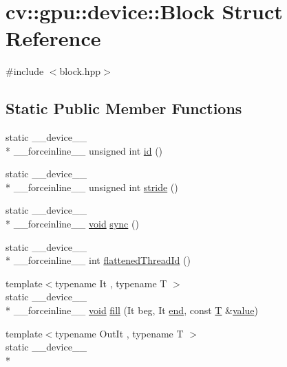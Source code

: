 \hypertarget{structcv_1_1gpu_1_1device_1_1Block}{\section{cv\-:\-:gpu\-:\-:device\-:\-:Block Struct Reference}
\label{structcv_1_1gpu_1_1device_1_1Block}
}


{\ttfamily \#include $<$block.\-hpp$>$}

\subsection*{Static Public Member Functions}
\begin{DoxyCompactItemize}
\item 
static \-\_\-\-\_\-device\-\_\-\-\_\- \\*
\-\_\-\-\_\-forceinline\-\_\-\-\_\- unsigned int \hyperlink{structcv_1_1gpu_1_1device_1_1Block_a281c6ab4eaef548f3cd42370a52c4a69}{id} ()
\item 
static \-\_\-\-\_\-device\-\_\-\-\_\- \\*
\-\_\-\-\_\-forceinline\-\_\-\-\_\- unsigned int \hyperlink{structcv_1_1gpu_1_1device_1_1Block_a998255c661a3814a93b805107d785fc2}{stride} ()
\item 
static \-\_\-\-\_\-device\-\_\-\-\_\- \\*
\-\_\-\-\_\-forceinline\-\_\-\-\_\- \hyperlink{legacy_8hpp_a8bb47f092d473522721002c86c13b94e}{void} \hyperlink{structcv_1_1gpu_1_1device_1_1Block_acdd49688468cd51c8ea0dddb7e52f55e}{sync} ()
\item 
static \-\_\-\-\_\-device\-\_\-\-\_\- \\*
\-\_\-\-\_\-forceinline\-\_\-\-\_\- int \hyperlink{structcv_1_1gpu_1_1device_1_1Block_ad005a95f3a705d55ae86f0c7fb8da308}{flattened\-Thread\-Id} ()
\item 
{\footnotesize template$<$typename It , typename T $>$ }\\static \-\_\-\-\_\-device\-\_\-\-\_\- \\*
\-\_\-\-\_\-forceinline\-\_\-\-\_\- \hyperlink{legacy_8hpp_a8bb47f092d473522721002c86c13b94e}{void} \hyperlink{structcv_1_1gpu_1_1device_1_1Block_a5c027dfe2cc3280ac3e54c9b8e75e053}{fill} (It beg, It \hyperlink{legacy_8hpp_ab21668ff869102944cbf3bb534bba27d}{end}, const \hyperlink{calib3d_8hpp_a3efb9551a871ddd0463079a808916717}{T} \&\hyperlink{highgui__c_8h_ad4670c92695d4327c21292905a803901}{value})
\item 
{\footnotesize template$<$typename Out\-It , typename T $>$ }\\static \-\_\-\-\_\-device\-\_\-\-\_\- \\*

\end{DoxyCompactItemize}
